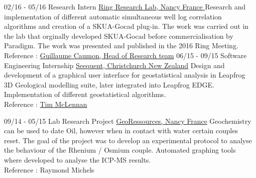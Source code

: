 \documentclass[]{friggeri-cv}
\begin{document}
    \vspace*{\fill}
    \begin{entrylist}
    \entry
    {02/16 - 05/16}
    {Research Intern}
    {\href{http://www.ring-team.org/}{Ring Research Lab, Nancy France }}
    {Research and implementation of different automatic simultaneous well log correlation algorithms and creation of a SKUA-Gocad plug-in. The work was carried out in the lab that orginally developed SKUA-Gocad before commercialisation by Paradigm. The work was presented and published in the 2016 Ring Meeting. \\Reference : \href{mailto:Guillaume.Caumon@ensg.univ-lorraine.fr}{Guillaume Caumon, Head of Research team}}
    \entry
    {06/15 - 09/15}
    {Software Engineering Internship}
    {\href{https://www.seequent.com/}{Seequent, Christchurch New Zealand}}
    {Design and development of a graphical user interface for geostatistical analysis in Leapfrog 3D Geological modelling suite, later integrated into Leapfrog EDGE. Implementation of different geostatistical algorithms.
    \\
    Reference : \href{mailto:tim.mclennan@seequent.com}{Tim McLennan}}

	\entry
	{09/14 - 05/15}
	{Lab Research Project}
	{\href{http://georessources.univ-lorraine.fr/}{GeoRessources, Nancy France}}
	{Geochemistry can be used to date Oil, however when in contact with water certain couples reset. The goal of the project was to develop an experimental protocol to analyse the behaviour of the Rhenium / Osmium couple. Automated graphing tools where developed to analyse the ICP-MS results.
		\\
		Reference : Raymond Michels}
\end{entrylist}
\end{document}
